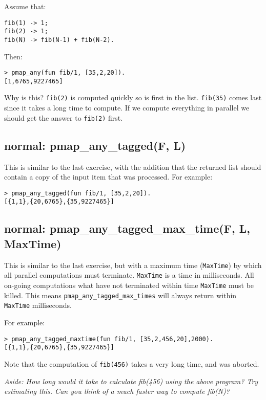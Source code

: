 \documentclass[12pt]{hitec}
\begin{document}
Assume that:

\begin{Verbatim}
fib(1) -> 1;
fib(2) -> 1; 
fib(N) -> fib(N-1) + fib(N-2).
\end{Verbatim}

Then:

\begin{Verbatim}
> pmap_any(fun fib/1, [35,2,20]).
[1,6765,9227465]
\end{Verbatim}

Why is this? \verb+fib(2)+ is computed quickly so is first in the
list.  \verb+fib(35)+ comes last since it takes a long time to
compute. If we compute everything in parallel we should get the answer
to \verb+fib(2)+ first.

\subsection{normal: pmap\_any\_tagged(F, L)}

This is similar to the last exercise, with the addition that the returned
list should contain a copy of the input item that was processed. For example:

\begin{Verbatim}
> pmap_any_tagged(fun fib/1, [35,2,20]).
[{1,1},{20,6765},{35,9227465}]
\end{Verbatim}

\subsection{normal: pmap\_any\_tagged\_max\_time(F, L, MaxTime)}

This is similar to the last exercise, but with a maximum time 
(\verb+MaxTime+) by which all
parallel computations must terminate. \verb+MaxTime+ is a time in milliseconds.
All on-going computations what have not terminated within time
\verb+MaxTime+ must be killed. This means  \verb+pmap_any_tagged_max_times+
will always return within \verb+MaxTime+ milliseconds.

For example:

\begin{Verbatim}
> pmap_any_tagged_maxtime(fun fib/1, [35,2,456,20],2000).
[{1,1},{20,6765},{35,9227465}]
\end{Verbatim}

Note that the computation of \verb+fib(456)+ takes a very long time,
and was aborted.

{\sl Aside: How long would it take to calculate fib(456) using the above program?
Try estimating this. Can you think of a much faster way to compute fib(N)?}
\end{document}
